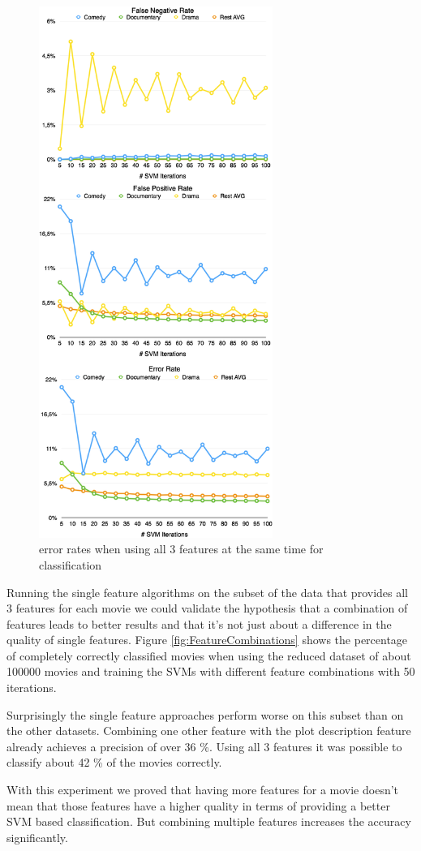 \documentclass{vldb}
\begin{document}
\begin{figure}
\begin{center}
\includegraphics[width=3.00in]{ErrorRatesCombined.png}
\caption{error rates when using all 3 features at the same time for classification}
\label{fig:ErrorRatesCombined}
\end{center}
\end{figure}


\par Running the single feature algorithms on the subset of the data that provides all 3 features for each movie we could validate the hypothesis that a combination of features leads to better results and that it's not just about a difference in the quality of single features. Figure \ref{fig:FeatureCombinations} shows the percentage of completely correctly classified movies when using the reduced dataset of about 100000 movies and training the SVMs with different feature combinations with 50 iterations. 
\par Surprisingly the single feature approaches perform worse on this subset than on the other datasets. Combining one other feature with the plot description feature already achieves a precision of over 36 \%. Using all 3 features it was possible to classify about 42 \% of the movies correctly.
\par With this experiment we proved that having more features for a movie doesn't mean that those features have a higher quality in terms of providing a better SVM based classification. But combining multiple features increases the accuracy significantly.
\end{document}
